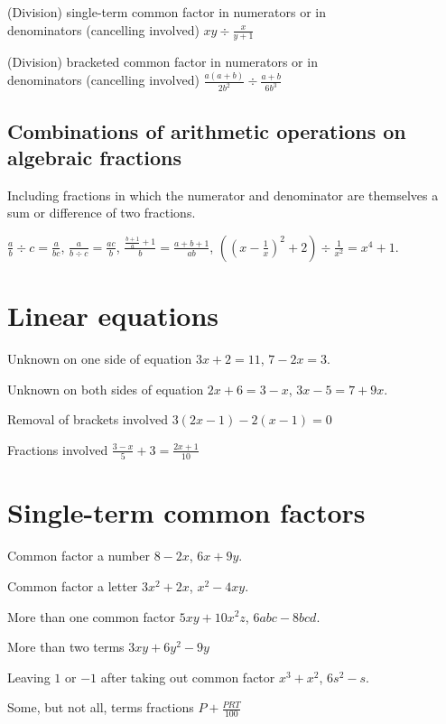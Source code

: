 \documentclass{article}
\begin{document}
(Division) single-term common factor in numerators or in \\
denominators (cancelling involved) \hfill  \(xy \div \frac{x}{y+1}\)

(Division) bracketed common factor in numerators or in \\
denominators (cancelling involved)  \hfill  \(\frac{a(a+b)}{2b^2} \div \frac{a+b}{6b^3}\)

\subsection{Combinations of arithmetic operations on algebraic fractions}

Including fractions in which the numerator and denominator are themselves a sum or difference of two fractions.

\(\frac{a}{b}\div c = \frac{a}{bc}\), \(\frac{a}{b \div c} = \frac{ac}{b}\), \(\frac{\frac{b+1}{a}+1}{b} = \frac{a+b+1}{ab}\),
\(\left(  \left(  x - \frac{1}{x} \right)  ^2 + 2 \right)  \div \frac{1}{x^2} = x^4 + 1\).

\section{Linear equations}

Unknown on one side of equation \hfill \(3x+2 = 11\), \(7-2x = 3\).

Unknown on both sides of equation \hfill \(2x+6=3-x\), \(3x-5 = 7+9x\).

Removal of brackets involved \hfill \(3(2x-1)-2(x-1)=0\)

Fractions involved \hfill \(\frac{3-x}{5} + 3 = \frac{2x+1}{10}\)

\section{Single-term common factors}

Common factor a number \hfill \(8 - 2x\), \(6x+9y\).

Common factor a letter \hfill \(3x^2 + 2x\), \(x^2 - 4xy\).

More than one common factor \hfill \(5xy + 10x^2z\), \(6abc - 8bcd\).

More than two terms \hfill \(3xy + 6y^2 - 9y\)

Leaving \(1\) or \(-1\) after taking out common factor \hfill \(x^3+x^2\), \(6s^2 - s\).

Some, but not all, terms fractions \hfill \(P + \frac{PRT}{100}\)
\end{document}
